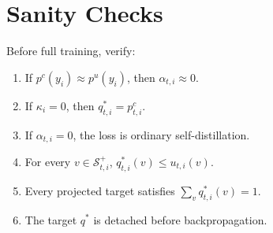 \documentclass[10pt]{article}
\begin{document}
\section{Sanity Checks}

Before full training, verify:
\begin{enumerate}[leftmargin=1.5em]
    \item If $p^c(y_i)\approx p^u(y_i)$, then $\alpha_{t,i}\approx0$.
    \item If $\kappa_i=0$, then $q^*_{t,i}=p^c_{t,i}$.
    \item If $\alpha_{t,i}=0$, the loss is ordinary self-distillation.
    \item For every $v\in\mathcal{S}^+_{t,i}$, $q^*_{t,i}(v)\le u_{t,i}(v)$.
    \item Every projected target satisfies $\sum_v q^*_{t,i}(v)=1$.
    \item The target $q^*$ is detached before backpropagation.
\end{enumerate}
\end{document}

